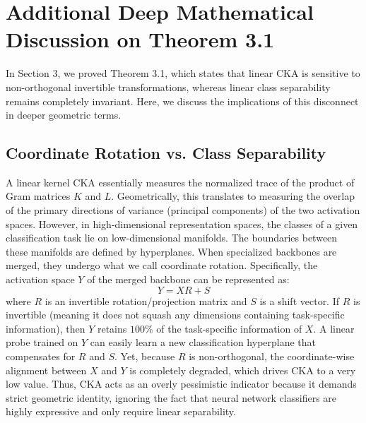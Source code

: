 \documentclass{article}
\theoremstyle{plain}
\theoremstyle{definition}
\theoremstyle{remark}
\begin{document}
\section{Additional Deep Mathematical Discussion on Theorem 3.1}
\label{app:math}

In Section 3, we proved Theorem 3.1, which states that linear CKA is sensitive to non-orthogonal invertible transformations, whereas linear class separability remains completely invariant. Here, we discuss the implications of this disconnect in deeper geometric terms.

\subsection{Coordinate Rotation vs. Class Separability}
A linear kernel CKA essentially measures the normalized trace of the product of Gram matrices $K$ and $L$. Geometrically, this translates to measuring the overlap of the primary directions of variance (principal components) of the two activation spaces.
However, in high-dimensional representation spaces, the classes of a given classification task lie on low-dimensional manifolds. The boundaries between these manifolds are defined by hyperplanes.
When specialized backbones are merged, they undergo what we call coordinate rotation. Specifically, the activation space $Y$ of the merged backbone can be represented as:
\begin{equation}
  Y = X R + S
\end{equation}
where $R$ is an invertible rotation/projection matrix and $S$ is a shift vector.
If $R$ is invertible (meaning it does not squash any dimensions containing task-specific information), then $Y$ retains $100\%$ of the task-specific information of $X$. A linear probe trained on $Y$ can easily learn a new classification hyperplane that compensates for $R$ and $S$.
Yet, because $R$ is non-orthogonal, the coordinate-wise alignment between $X$ and $Y$ is completely degraded, which drives CKA to a very low value.
Thus, CKA acts as an overly pessimistic indicator because it demands strict geometric identity, ignoring the fact that neural network classifiers are highly expressive and only require linear separability.
\end{document}
